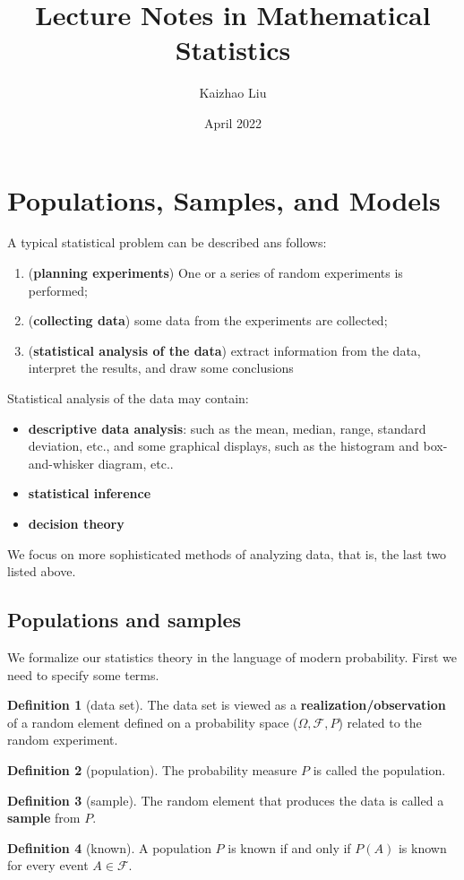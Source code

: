 \documentclass{article}
\title{Lecture Notes in Mathematical Statistics}
\author{Kaizhao Liu}
\date{April 2022}
\theoremstyle{definition}
\newtheorem{Def}{Definition}[section]
\begin{document}
\maketitle
\tableofcontents

\section{Populations, Samples, and Models}
A typical statistical problem can be described ans follows:
\begin{enumerate}
\item (\textbf{planning experiments}) One or a series of random experiments is performed;
\item (\textbf{collecting data}) some data from the experiments are collected;
\item (\textbf{statistical analysis of the data}) extract information from the data, interpret the results, and draw some conclusions
\end{enumerate}
Statistical analysis of the data may contain:
\begin{itemize}
\item \textbf{descriptive data analysis}: such as the mean, median, range, standard deviation, etc., and some graphical displays, such as the histogram and box-and-whisker diagram, etc..
\item \textbf{statistical inference}
\item \textbf{decision theory}
\end{itemize}
We focus on more sophisticated methods of analyzing data, that is, the last two listed above.
\subsection{Populations and samples}
We formalize our statistics theory in the language of modern probability. First we need to specify some terms.
\begin{Def}[data set]
The data set is viewed as a \textbf{realization/observation} of a random element defined on a probability space ($\Omega,\mathcal{F},P$) related to the random experiment.
\end{Def}
\begin{Def}[population]
The probability measure $P$ is called the population.
\end{Def}
\begin{Def}[sample]
The random element that produces the data is called a \textbf{sample} from $P$. 
\end{Def}
\begin{Def}[known]
A population $P$ is known if and only if $P(A)$ is known for every event $A\in\mathcal{F}$.
\end{Def}
\end{document}
